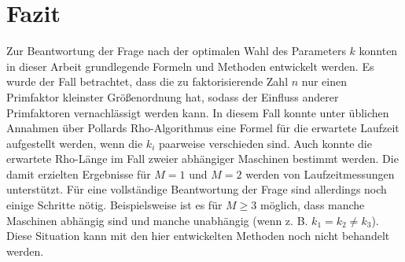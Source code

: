 \documentclass[a4paper, 11pt, ngerman]{article}
\theoremstyle{definition}
\theoremstyle{plain}
\theoremstyle{remark}
\begin{document}
\begin{figure}

\end{figure}

\section{Fazit}

Zur Beantwortung der Frage nach der optimalen Wahl des Parameters $k$ konnten in dieser Arbeit grundlegende Formeln und Methoden entwickelt werden. Es wurde der Fall betrachtet, dass die zu faktorisierende Zahl $n$ nur einen Primfaktor kleinster Größenordnung hat, sodass der Einfluss anderer Primfaktoren vernachlässigt werden kann. In diesem Fall konnte unter üblichen Annahmen über Pollards Rho-Algorithmus eine Formel für die erwartete Laufzeit aufgestellt werden, wenn die $k_i$ paarweise verschieden sind. Auch konnte die erwartete Rho-Länge im Fall zweier abhängiger Maschinen bestimmt werden. Die damit erzielten Ergebnisse für $M = 1$ und $M = 2$ werden von Laufzeitmessungen unterstützt. Für eine vollständige Beantwortung der Frage sind allerdings noch einige Schritte nötig. Beispielsweise ist es für $M \ge 3$ möglich, dass manche Maschinen abhängig sind und manche unabhängig (wenn z. B. $k_1 = k_2 \ne k_3$). Diese Situation kann mit den hier entwickelten Methoden noch nicht behandelt werden.

\newpage
\printbibliography
\end{document}
